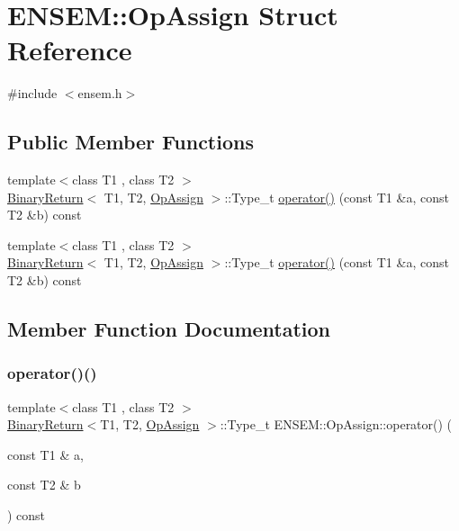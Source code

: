 \hypertarget{structENSEM_1_1OpAssign}{}\section{E\+N\+S\+EM\+:\+:Op\+Assign Struct Reference}
\label{structENSEM_1_1OpAssign}


{\ttfamily \#include $<$ensem.\+h$>$}

\subsection*{Public Member Functions}
\begin{DoxyCompactItemize}
\item 
{\footnotesize template$<$class T1 , class T2 $>$ }\\\mbox{\hyperlink{structENSEM_1_1BinaryReturn}{Binary\+Return}}$<$ T1, T2, \mbox{\hyperlink{structENSEM_1_1OpAssign}{Op\+Assign}} $>$\+::Type\+\_\+t \mbox{\hyperlink{structENSEM_1_1OpAssign_aaab39b3bd0c80dac6b56a48970ff388a}{operator()}} (const T1 \&a, const T2 \&b) const
\item 
{\footnotesize template$<$class T1 , class T2 $>$ }\\\mbox{\hyperlink{structENSEM_1_1BinaryReturn}{Binary\+Return}}$<$ T1, T2, \mbox{\hyperlink{structENSEM_1_1OpAssign}{Op\+Assign}} $>$\+::Type\+\_\+t \mbox{\hyperlink{structENSEM_1_1OpAssign_aaab39b3bd0c80dac6b56a48970ff388a}{operator()}} (const T1 \&a, const T2 \&b) const
\end{DoxyCompactItemize}


\subsection{Member Function Documentation}
\mbox{\label{structENSEM_1_1OpAssign_aaab39b3bd0c80dac6b56a48970ff388a}} 
\subsubsection{\texorpdfstring{operator()()}{operator()()}\hspace{0.1cm}{\footnotesize\ttfamily [1/2]}}
{\footnotesize\ttfamily template$<$class T1 , class T2 $>$ \\
\mbox{\hyperlink{structENSEM_1_1BinaryReturn}{Binary\+Return}}$<$T1, T2, \mbox{\hyperlink{structENSEM_1_1OpAssign}{Op\+Assign}} $>$\+::Type\+\_\+t E\+N\+S\+E\+M\+::\+Op\+Assign\+::operator() (\begin{DoxyParamCaption}\item[{const T1 \&}]{a,  }\item[{const T2 \&}]{b }\end{DoxyParamCaption}) const\hspace{0.3cm}{\ttfamily [inline]}}

